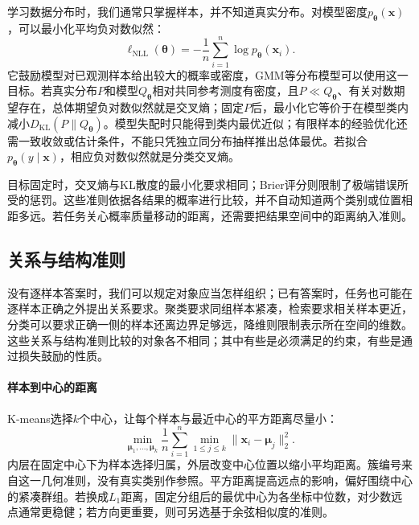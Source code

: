 学习数据分布时，我们通常只掌握样本，并不知道真实分布。对模型密度$p_{\bm\theta}(\bm x)$，可以最小化平均负对数似然：
\begin{equation}
  \ell_{\mathrm{NLL}}(\bm{\theta})
  =-\frac{1}{n}\sum_{i=1}^{n}\log p_{\bm{\theta}}(\bm{x}_i).
  \label{eq:models-negative-log-likelihood}
\end{equation}
它鼓励模型对已观测样本给出较大的概率或密度，GMM等分布模型可以使用这一目标。若真实分布$P$和模型$Q_{\bm\theta}$相对共同参考测度有密度，且$P\ll Q_{\bm\theta}$、有关对数期望存在，总体期望负对数似然就是交叉熵；固定$P$后，最小化它等价于在模型类内减小$D_{\mathrm{KL}}(P\|Q_{\bm\theta})$。模型失配时只能得到类内最优近似；有限样本的经验优化还需一致收敛或估计条件，不能只凭独立同分布抽样推出总体最优。若拟合$p_{\bm\theta}(y\mid\bm x)$，相应负对数似然就是分类交叉熵。

目标固定时，交叉熵与KL散度的最小化要求相同；Brier评分则限制了极端错误所受的惩罚。这些准则依据各结果的概率进行比较，并不自动知道两个类别或位置相距多远。若任务关心概率质量移动的距离，还需要把结果空间中的距离纳入准则。

\subsection{关系与结构准则}
\label{sec:models-spatial-objectives}

没有逐样本答案时，我们可以规定对象应当怎样组织；已有答案时，任务也可能在逐样本正确之外提出关系要求。聚类要求同组样本紧凑，检索要求相关样本更近，分类可以要求正确一侧的样本还离边界足够远，降维则限制表示所在空间的维数。这些关系与结构准则比较的对象各不相同；其中有些是必须满足的约束，有些是通过损失鼓励的性质。

\paragraph{样本到中心的距离}

K-means选择$k$个中心，让每个样本与最近中心的平方距离尽量小：
\begin{equation}
  \min_{\bm{\mu}_1,\ldots,\bm{\mu}_k}
  \frac{1}{n}\sum_{i=1}^{n}\min_{1\leq j\leq k}
  \lVert\bm{x}_i-\bm{\mu}_j\rVert_2^2.
  \label{eq:models-kmeans-objective}
\end{equation}
内层在固定中心下为样本选择归属，外层改变中心位置以缩小平均距离。簇编号来自这一几何准则，没有真实类别作参照。平方距离提高远点的影响，偏好围绕中心的紧凑群组。若换成$L_1$距离，固定分组后的最优中心为各坐标中位数，对少数远点通常更稳健；若方向更重要，则可另选基于余弦相似度的准则。

